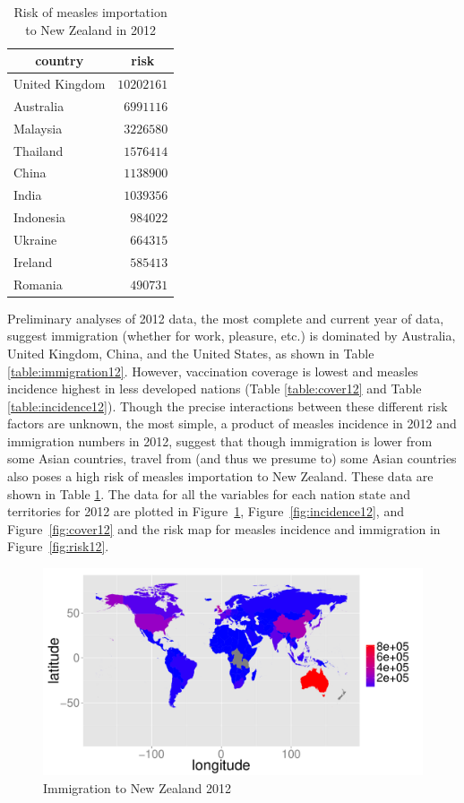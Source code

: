 \documentclass{article}
\begin{document}
\begin{table}
\caption{Risk of measles importation to New Zealand in 2012}
\begin{center}
\begin{tabular}{lr}
\hline\hline
\multicolumn{1}{c}{country}&\multicolumn{1}{c}{risk}\tabularnewline
\hline
United Kingdom&$10202161$\tabularnewline
Australia&$ 6991116$\tabularnewline
Malaysia&$ 3226580$\tabularnewline
Thailand&$ 1576414$\tabularnewline
China&$ 1138900$\tabularnewline
India&$ 1039356$\tabularnewline
Indonesia&$  984022$\tabularnewline
Ukraine&$  664315$\tabularnewline
Ireland&$  585413$\tabularnewline
Romania&$  490731$\tabularnewline
\hline
\end{tabular}\end{center}\label{table:risk12}
\end{table}

Preliminary analyses of 2012 data, the most complete and current year of data, suggest immigration (whether for work, pleasure, etc.) is dominated by Australia, United Kingdom, China, and the United States, as shown in Table \ref{table:immigration12}. However, vaccination coverage is lowest and measles incidence highest in less developed nations (Table \ref{table:cover12} and Table \ref{table:incidence12}). Though the precise interactions between these different risk factors are unknown, the most simple, a product of measles incidence in 2012 and immigration numbers in 2012, suggest that though immigration is lower from some Asian countries, travel from (and thus we presume to) some Asian countries also poses a high risk of measles importation to New Zealand. These data are shown in Table \ref{table:risk12}. The data for all the variables for each nation state and territories for 2012 are plotted in Figure~\ref{fig:immigration12}, Figure~\ref{fig:incidence12}, and Figure~\ref{fig:cover12} and the risk map for measles incidence and immigration in Figure~\ref{fig:risk12}.


\begin{figure}[h!]
\begin{center}
\includegraphics{interimreport1-007}
\end{center}
\caption{Immigration to New Zealand 2012}
\label{fig:immigration12}
\end{figure}
\end{document}
